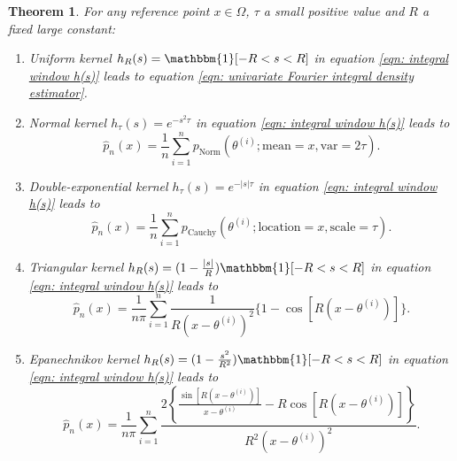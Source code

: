 \documentclass[%
 reprint,
 amsmath,amssymb,
 aps,
]{revtex4-2}
\newtheorem{theorem}{Theorem}[section]
\begin{document}
\begin{theorem} \label{theorem: FI integral windows}
For any reference point $x \in \Omega$, $\tau$ a small positive value and $R$ a fixed large constant:
    \begin{enumerate}
        \item Uniform kernel $h_R(s) = \mathbbm{1}[-R < s < R]$ in equation \eqref{eqn: integral window h(s)} leads to equation \eqref{eqn: univariate Fourier integral density estimator}.
        \item Normal kernel $h_\tau(s) = e^{-s^2\tau}$ in equation \eqref{eqn: integral window h(s)} leads to
        \begin{equation} \label{eqn: normal window FI}
            \hat{p}_n(x) = \frac{1}{n} \sum_{i = 1}^n p_\text{Norm}(\theta^{(i)}; \text{mean} = x, \text{var} = 2\tau).
        \end{equation}
        \item Double-exponential kernel $h_\tau(s) = e^{-|s|\tau}$ in equation \eqref{eqn: integral window h(s)} leads to \begin{equation} \label{eqn: Cauchy window FI}
            \hat{p}_n(x) = \frac{1}{n} \sum_{i = 1}^n p_\text{Cauchy}(\theta^{(i)}; \text{location} = x, \text{scale} = \tau).
        \end{equation}
        \item Triangular kernel $h_R(s) = (1 - \frac{|s|}{R}) \mathbbm{1}[-R < s < R]$ in equation \eqref{eqn: integral window h(s)} leads to
        \begin{equation} \label{eqn: triangular kernel window FI}
            \hat{p}_n(x) = \frac{1}{n\pi} \sum_{i = 1}^n \frac{1}{R(x - \theta^{(i)})^2}\{1 - \cos[R(x - \theta^{(i)})]\}.
        \end{equation}
        \item Epanechnikov kernel $h_R(s) = (1 - \frac{s^2}{R^2}) \mathbbm{1}[-R < s < R]$ in equation \eqref{eqn: integral window h(s)} leads to
        \begin{equation} \label{eqn: Epanechnikov kernel window FI}
            \hat{p}_n(x) = \frac{1}{n\pi} \sum_{i = 1}^n \frac{2\left\{\frac{\sin[R(x - \theta^{(i)})]}{x - \theta^{(i)}} - R\cos[R(x - \theta^{(i)})] \right\}}{R^2(x - \theta^{(i)})^2}.
        \end{equation}
    \end{enumerate}
\end{theorem}
\end{document}
